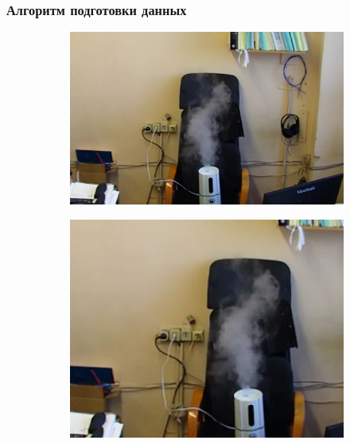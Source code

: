 \documentclass[t]{beamer}
\begin{document}
	\begin{frame}
		\frametitle{Алгоритм подготовки данных}
		\vspace*{-0.2cm}
					\begin{figure}[ht!]
						\hspace*{-1.325cm}
							\begin{subfigure}{0.4\textwidth}
									\centering
									\includegraphics[width = \textwidth]{image/examp111}
							\end{subfigure}
							\begin{subfigure}{0.3\textwidth}
								\centering
								\includegraphics[width = \textwidth]{image/1}
							\end{subfigure}
							

\end{figure}
\end{frame}
\end{document}
